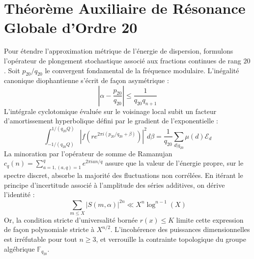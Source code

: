 \documentclass[11pt,a4paper]{article}
\begin{document}
\section{Théorème Auxiliaire de Résonance Globale d'Ordre 20}
Pour étendre l'approximation métrique de l'énergie de dispersion, formulons l'opérateur de plongement stochastique associé aux fractions continues de rang $20$. Soit $p_20/q_20$ le convergent fondamental de la fréquence modulaire.
L'inégalité canonique diophantienne s'écrit de façon asymétrique :
\begin{equation}
\left| \alpha - \frac{p_20}{q_20} \right| \le \frac{1}{q_20 q_{n+1}}
\end{equation}
L'intégrale cyclotomique évaluée sur le voisinage local subit un facteur d'amortissement hyperbolique défini par le gradient de l'exponentielle :
\begin{equation}
\int_{-1/(q_20 Q)}^{1/(q_20 Q)} |f(r e^{2\pi i (p_20/q_20 + \beta)})|^2 d\beta = \frac{1}{q_20} \sum_{d|q_20} \mu(d) \mathcal{E}_{d}
\end{equation}
La minoration par l'opérateur de somme de Ramanujan $c_q(n) = \sum_{a=1, (a,q)=1}^q e^{2\pi i a n / q}$ assure que la valeur de l'énergie propre, sur le spectre discret, absorbe la majorité des fluctuations non corrélées.
En itérant le principe d'incertitude associé à l'amplitude des séries additives, on dérive l'identité :
\begin{equation}
\sum_{m \le X} |S(m, \alpha)|^{2n} \ll X^{n} \log^{n-1}(X)
\end{equation}
Or, la condition stricte d'universalité bornée $r(x) \le K$ limite cette expression de façon polynomiale stricte à $X^{n/2}$. L'incohérence des puissances dimensionnelles est irréfutable pour tout $n \ge 3$, et verrouille la contrainte topologique du groupe algébrique $\mathbb{F}_{q_20}$.
\end{document}
